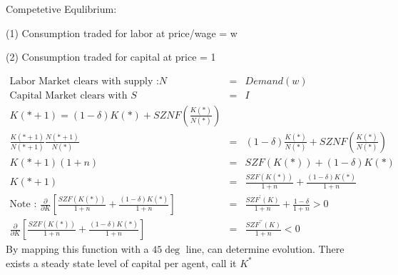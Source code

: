 Competetive Equlibrium:
\begin{list}{ }{}
\item (1) Consumption traded for labor at price/wage = w
\item (2) Consumption traded for capital at price = 1
\end{list}
\begin{eqnarray*}
\mbox{Labor Market clears with supply :} N &=& Demand(w)\\
\mbox{Capital Market clears with } S &=& I\\
K(*+1) = (1-\delta) K(*) + SZNF\left( \frac{K(*)}{N(*)}\right)\\
\frac{K(*+1)}{N(*+1)} \frac{N(*+1)}{N(*)} &=& (1-\delta) \frac{K(*)}{N(*)} + SZNF\left( \frac{K(*)}{N(*)}\right)\\
K(*+1) (1+n) &=& SZF(K(*)) + (1-\delta) K(*)\\
K(*+1) &=& \frac{SZF(K(*))}{1+n} + \frac{(1-\delta) K(*)}{1+n}\\
\mbox{Note : } \frac{\partial}{\partial K}\left[ \frac{SZF(K(*))}{1+n} + \frac{(1-\delta) K(*)}{1+n}\right] &=& \frac{SZF^\prime(K)}{1+n} + \frac{1-\delta}{1+n} > 0\\
\frac{\partial}{\partial K}\left[ \frac{SZF(K(*))}{1+n} + \frac{(1-\delta) K(*)}{1+n}\right] &=& \frac{SZF^{\prime\prime}(K)}{1+n} < 0 
\end{eqnarray*}
By mapping this function with a $45\deg$ line, can determine evolution. There exists a steady state level of capital per agent, call it $K^*$ \\
